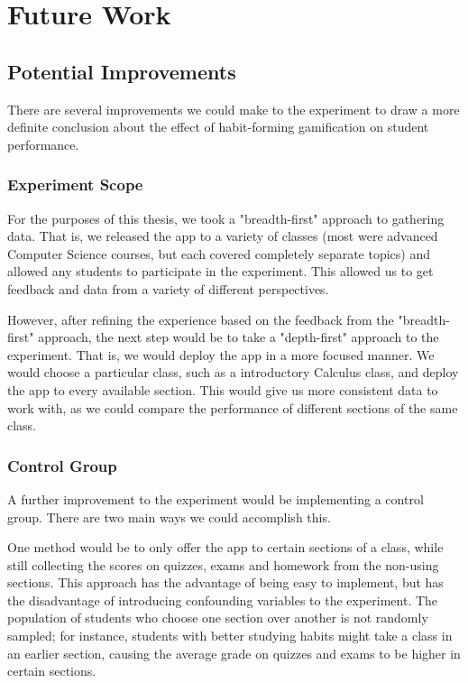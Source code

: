 \chapter{Future Work}

\section{Potential Improvements}

\par There are several improvements we could make to the experiment to draw a more definite conclusion about the effect of habit-forming gamification on student performance.

\subsection{Experiment Scope}

\par For the purposes of this thesis, we took a "breadth-first" approach to gathering data. That is, we released the app to a variety of classes (most were advanced Computer Science courses, but each covered completely separate topics) and allowed any students to participate in the experiment. This allowed us to get feedback and data from a variety of different perspectives.

\par However, after refining the experience based on the feedback from the "breadth-first" approach, the next step would be to take a "depth-first" approach to the experiment. That is, we would deploy the app in a more focused manner. We would choose a particular class, such as a introductory Calculus class, and deploy the app to every available section. This would give us more consistent data to work with, as we could compare the performance of different sections of the same class.

\subsection{Control Group}
\par A further improvement to the experiment would be implementing a control group. There are two main ways we could accomplish this. 

\par One method would be to only offer the app to certain sections of a class, while still collecting the scores on quizzes, exams and homework from the non-using sections. This approach has the advantage of being easy to implement, but has the disadvantage of introducing confounding variables to the experiment. The population of students who choose one section over another is not randomly sampled; for instance, students with better studying habits might take a class in an earlier section, causing the average grade on quizzes and exams to be higher in certain sections.

